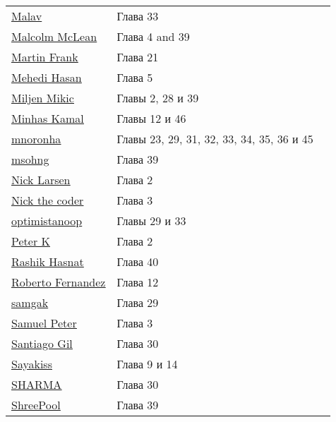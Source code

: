 \newpage
\vspace{\baselineskip}
\begin{tabular}{p{50mm}ll}
\href{https://stackoverflow.com/users/3572733/}{\underline{Malav}} & Глава 33 \\
\href{https://stackoverflow.com/users/3310281/}{\underline{Malcolm McLean}} & Глава 4 and 39 \\
\href{https://stackoverflow.com/users/2910751/}{\underline{Martin Frank}} & Глава 21 \\
\href{https://stackoverflow.com/users/2176115/}{\underline{Mehedi Hasan}} & Глава 5 \\
\href{https://stackoverflow.com/users/1460628/}{\underline{Miljen Mikic}} & Главы 2, 28 и 39 \\
\href{https://stackoverflow.com/users/4684058/}{\underline{Minhas Kamal}} & Главы 12 и 46 \\
\href{https://stackoverflow.com/users/2608433/}{\underline{mnoronha}} & Главы 23, 29, 31, 32, 33, 34, 35, 36 и 45 \\
\href{https://stackoverflow.com/users/3208967/}{\underline{msohng}} & Глава 39 \\
\href{https://stackoverflow.com/users/178082/}{\underline{Nick Larsen}} & Глава 2 \\
\href{https://stackoverflow.com/users/4298392/}{\underline{Nick the coder}} & Глава 3 \\
\href{https://stackoverflow.com/users/3566045/}{\underline{optimistanoop}} & Главы 29 и 33 \\
\href{https://stackoverflow.com/users/4896952/}{\underline{Peter K}} & Глава 2 \\
\href{https://stackoverflow.com/users/6400629/}{\underline{Rashik Hasnat}} & Глава 40 \\
\href{https://stackoverflow.com/users/4110708/}{\underline{Roberto Fernandez}} & Глава 12 \\
\href{https://stackoverflow.com/users/696391/}{\underline{samgak}} & Глава 29 \\
\href{https://stackoverflow.com/users/2510655/}{\underline{Samuel Peter}} & Глава 3 \\
\href{https://stackoverflow.com/users/5379399/}{\underline{Santiago Gil}} & Глава 30 \\
\href{https://stackoverflow.com/users/1291716/}{\underline{Sayakiss}} & Глава 9 и 14 \\
\href{https://stackoverflow.com/users/3465421/}{\underline{SHARMA}} & Глава 30 \\
\href{https://stackoverflow.com/users/5956891/}{\underline{ShreePool}} & Глава 39 \\

\end{tabular}
